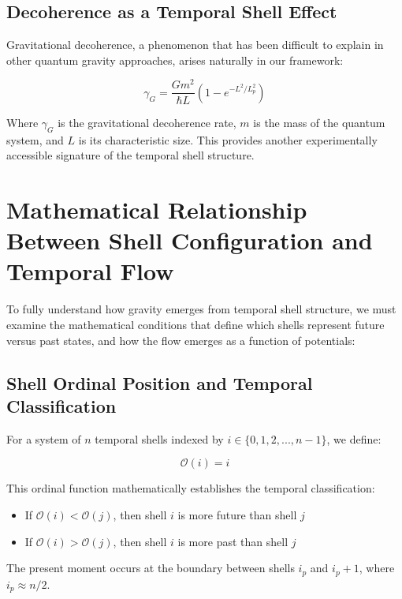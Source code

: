 \documentclass[12pt,a4paper]{article}
\begin{document}
\subsection{Decoherence as a Temporal Shell Effect}

Gravitational decoherence, a phenomenon that has been difficult to explain in other quantum gravity approaches, arises naturally in our framework:

\begin{equation}
\gamma_G = \frac{Gm^2}{\hbar L}\left(1 - e^{-L^2/L_p^2}\right)
\end{equation}

Where $\gamma_G$ is the gravitational decoherence rate, $m$ is the mass of the quantum system, and $L$ is its characteristic size. This provides another experimentally accessible signature of the temporal shell structure.

\section{Mathematical Relationship Between Shell Configuration and Temporal Flow}

To fully understand how gravity emerges from temporal shell structure, we must examine the mathematical conditions that define which shells represent future versus past states, and how the flow emerges as a function of potentials:

\subsection{Shell Ordinal Position and Temporal Classification}

For a system of $n$ temporal shells indexed by $i \in \{0, 1, 2, ..., n-1\}$, we define:

\begin{equation}
\mathcal{O}(i) = i
\end{equation}

This ordinal function mathematically establishes the temporal classification:
\begin{itemize}
    \item If $\mathcal{O}(i) < \mathcal{O}(j)$, then shell $i$ is more future than shell $j$
    \item If $\mathcal{O}(i) > \mathcal{O}(j)$, then shell $i$ is more past than shell $j$
\end{itemize}

The present moment occurs at the boundary between shells $i_p$ and $i_p+1$, where $i_p \approx n/2$.
\end{document}

